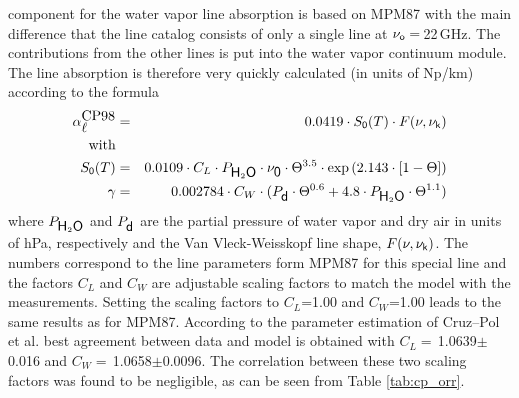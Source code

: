 {
\label{leveld:cp98}

\label{levele:cp98_h2oline}
component \citep{cruzpol:98} for the water vapor line absorption 
is based on MPM87 with the main difference that the 
line catalog consists of only a single line at $\nu_{\sf o}=$\,22\,GHz. 
The contributions from the other lines is put into the water vapor 
continuum module. The line absorption is therefore very quickly 
calculated (in units of Np/km) according to the formula
\begin{eqnarray}
  \label{eq:cp98:lineabs}
  \alphacpl &=& 0.0419 \cdot \intencp \cdot \shape \\
  \mbox{with} & & \nonumber\\
  \intencp    &=& 0.0109 \cdot C_L \cdot \phzo \cdot \nuo \cdot \Theta^{3.5} 
             \cdot \exp{(2.143\cdot[1-\Theta])}\nonumber\\
%
  \gamma &=& 0.002784 \cdot C_W \cdot (\pda \cdot \Theta^{0.6}+ 
             4.8 \cdot \phzo \cdot \Theta^{1.1}) \nonumber\\
\end{eqnarray}
where $P_{\mbox{\sf H}_{2}\mbox{\sf O}}$ and $P_{\mbox{\sf d}}$ are the partial pressure of water vapor and dry
air in units of hPa, respectively and the Van Vleck-Weisskopf line
shape, $F(\nu,\nu_{\sf k})$. The numbers correspond to the line
parameters form MPM87 for this special line and the factors  
$C_L$ and $C_W$ are adjustable scaling factors to match the model with the
measurements. Setting the scaling factors to $C_L$=1.00 and $C_W$=1.00 
leads to the same results as for MPM87. According to the parameter 
estimation of Cruz--Pol et al. best agreement between 
data and model is obtained with $C_L=$\,1.0639$\pm$0.016 and 
$C_W=$\,1.0658$\pm$0.0096. The correlation between these two scaling 
factors was found to be negligible, as can be seen from 
Table \ref{tab:cp_orr}.

}
